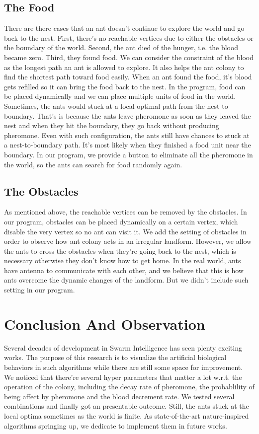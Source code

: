 \documentclass[12pt,journal,compsoc]{IEEEtran}
\begin{document}
\subsection{The Food}
There are there cases that an ant doesn't continue to explore the world and go back to the nest. First, there's no reachable vertices due to either the obstacles or the boundary of the world. Second, the ant died of the hunger, i.e. the blood became zero. Third, they found food. We can consider the constraint of the blood as the longest path an ant is allowed to explore. It also helps the ant colony to find the shortest path toward food easily. When an ant found the food, it's blood gets refilled so it can bring the food back to the nest. In the program, food can be placed dynamically and we can place multiple units of food in the world. Sometimes, the ants would stuck at a local optimal path from the nest to boundary. That's is because the ants leave pheromone as soon as they leaved the nest and when they hit the boundary, they go back without producing pheromone. Even with such configuration, the ants still have chances to stuck at a nest-to-boundary path. It's most likely when they finished a food unit near the boundary. In our program, we provide a button to eliminate all the pheromone in the world, so the ants can search for food randomly again.

\subsection{The Obstacles}
As mentioned above, the reachable vertices can be removed by the obstacles. In our program, obstacles can be placed dynamically on a certain vertex, which disable the very vertex so no ant can visit it. We add the setting of obstacles in order to observe how ant colony acts in an irregular landform. However, we allow the ants to cross the obstacles when they're going back to the nest, which is necessary otherwise they don't know how to get home. In the real world, ants have antenna to communicate with each other, and we believe that this is how ants overcome the dynamic changes of the landform. But we didn't include such setting in our program.


\section{Conclusion And Observation}
Several decades of development in Swarm Intelligence has seen plenty exciting works. The purpose of this research is to visualize the artificial biological behaviors in such algorithms while there are still some space for improvement. We noticed that there're several hyper parameters that matter a lot w.r.t. the operation of the colony, including the decay rate of pheromone, the probablility of being affect by pheromone and the blood decrement rate. We tested several combinations and finally got an presentable outcome. Still, the ants stuck at the local optima sometimes as the world is finite. As state-of-the-art nature-inspired algorithms springing up, we dedicate to implement them in future works.
\end{document}
